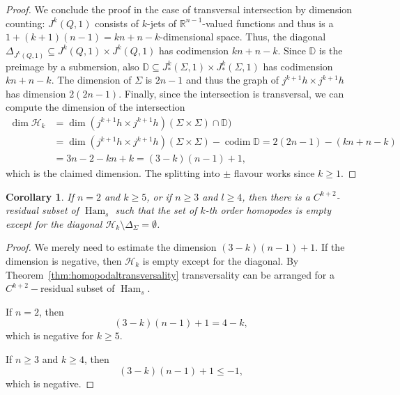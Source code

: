 \documentclass{amsart}
\newcommand{\Hcal}{{\mathcal{H}}}
\newcommand{\DD}{\mathbb{D}}
\newcommand{\RR}{\mathbb{R}}
\newcommand{\Ham}{\operatorname{Ham}}
\newcommand{\codim}{\operatorname{codim}}
\newtheorem{corollary}[theorem]{Corollary}
\theoremstyle{definition}
\theoremstyle{remark}
\numberwithin{equation}{section}
\begin{document}
\begin{proof}
We conclude the proof in the case of transversal intersection by dimension counting: $J^k(Q,1)$ consists of $k$-jets of $\RR^{n-1}$-valued functions and thus is a $1+(k+1)(n-1) = kn+n-k$-dimensional space. Thus, the diagonal $\Delta_{J^k(Q,1)}\subseteq J^k(Q,1)\times J^k(Q,1)$ has codimension $kn+n-k$. Since $\DD$ is the preimage by a submersion, also $\DD\subseteq J^k_*(\Sigma,1)\times J^k_*(\Sigma,1)$ has codimension $kn+n-k$. The dimension of $\Sigma$ is $2n-1$ and thus the graph of $j^{k+1}h\times j^{k+1}h$ has dimension $2(2n-1)$. Finally, since the intersection is transversal, we can compute the dimension of the intersection 
\begin{align*}
    \dim \Hcal_k &=\dim (j^{k+1}h\times j^{k+1}h)(\Sigma\times\Sigma)\cap \DD)\\
    &= \dim (j^{k+1}h\times j^{k+1}h)(\Sigma\times\Sigma) - \codim \DD = 2(2n-1) - (kn+n-k) \\
    &= 3n - 2 - kn + k = (3-k)(n-1)+1,
\end{align*}
which is the claimed dimension. The splitting into $\pm$ flavour works since $k\geq 1$. 
\end{proof}


\begin{corollary}\label{cor:dimensioncount}
    If $n=2$ and $k\geq 5$, or if $n\geq 3$ and $l\geq 4$, then there is a $C^{k+2}$-residual subset of $\Ham_s$ such that the set of $k$-th order homopodes is empty except for the diagonal $\Hcal_k\setminus\Delta_{\Sigma}=\emptyset$.
\end{corollary}
\begin{proof}
    We merely need to estimate the dimension $(3-k)(n-1)+1$. If the dimension is negative, then $\Hcal_k$ is empty except for the diagonal. By Theorem~\ref{thm:homopodaltransversality} transversality can be arranged for a $C^{k+2}-$residual subset of $\Ham_s$.
    
    If $n=2$, then 
    $$(3-k)(n-1)+1=4-k,$$
    which is negative for $k\geq 5$. 

    If $n\geq 3$ and $k\geq 4$, then 
    $$(3-k)(n-1)+1 \leq -1,$$
    which is negative. 
\end{proof}
















\end{document}

